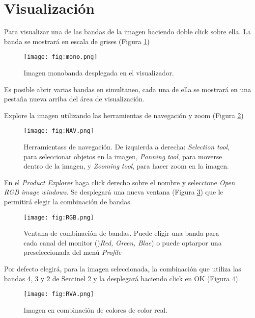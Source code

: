 \section{Visualización}

Para visualizar una de las bandas de la imagen haciendo doble click sobre ella. La banda se mostrará en escala de grises (Figura \ref{fig:mono})

\begin{figure}[h!]
    \centering
    \texttt{[image: fig:mono.png]}
    \caption{Imagen monobanda desplegada en el visualizador.}
    \label{fig:mono}
\end{figure}

Es posible abrir varias bandas en simultaneo, cada una de ella se mostrará en una pestaña nueva arriba del área de visualización.

Explore la imagen utilizando las herramientas de navegación y zoom (Figura \ref{fig:NAV})

\begin{figure}[h!]
    \centering
    \texttt{[image: fig:NAV.png]}
    \caption{Herramientass de navegación. De izquierda a derecha: \emph{Selection tool}, para seleccionar objetos en la imagen, \emph{Panning tool}, para moverse dentro de la imagen, y \emph{Zooming tool}, para hacer zoom en la imagen.}
    \label{fig:NAV}
\end{figure}

En el \emph{Product Explorer} haga click derecho sobre el nombre y seleccione \emph{Open RGB image windows}. Se desplegará una nueva ventana (Figura \ref{fig:RGB}) que le permitirá elegir la combinación de bandas.

\begin{figure}[h!]
    \centering
    \texttt{[image: fig:RGB.png]}
    \caption{Ventana de combinación de bandas. Puede eligir una banda para cada canal del monitor ()\emph{Red, Green, Blue}) o puede optarpor una preseleccionada del menú \emph{Profile}}
    \label{fig:RGB}
\end{figure}

Por defecto elegirá, para la imagen seleccionada, la combinación que utiliza las bandas 4, 3 y 2 de Sentinel 2 y la desplegará haciendo click en OK (Figura \ref{fig:RVA}).

\begin{figure}[h!]
    \centering
    \texttt{[image: fig:RVA.png]}
    \caption{Imagen en combinación de colores de color real.}
    \label{fig:RVA}
\end{figure}



